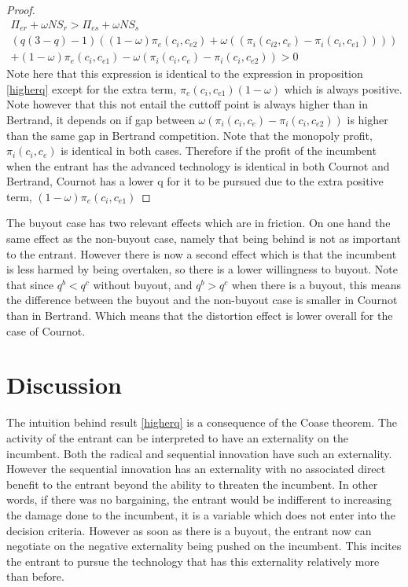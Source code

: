 \documentclass[12pt]{report}
\numberwithin{equation}{section}
\begin{document}
\begin{proof}
\begin{align*}
\Pi_{er} + \omega NS_{r}
> \Pi_{es} + \omega NS_{s} \\
(q  (3-q)-1)((1-\omega)\pi_{e}(c_i,c_{e2})+\omega((\pi_{i}(c_{i2},c_{e})-\pi_{i}(c_i,c_{e1})))) \\
+(1-\omega)\pi_{e}(c_i,c_{e1})
-\omega(\pi_{i}(c_i,c_{e}) 
-\pi_{i}(c_{i},c_{e2}))>0
\end{align*} 
Note here that this expression is identical to the expression in proposition \ref{higherq} except for the extra term, $\pi_{e}(c_i,c_{e1})(1-\omega)$ which is always positive. Note however that this not entail the cuttoff point is always higher than in Bertrand, it depends on if gap between $\omega(\pi_{i}(c_i,c_{e}) 
-\pi_{i}(c_{i},c_{e2}))$ is higher than the same gap in Bertrand competition. Note that the monopoly profit,$\pi_{i}(c_i,c_{e})$ is identical in both cases. Therefore if the profit of the incumbent when the entrant has the advanced technology is identical in both Cournot and Bertrand, Cournot has a lower q for it to be pursued due to the extra positive term, $(1-\omega) \pi_e(c_i,c_{e1})$ 
\end{proof}

The buyout case has two relevant effects which are in friction. On one hand the same effect as the non-buyout case, namely that being behind is not as important to the entrant. However there is now a second effect which is that the incumbent is less harmed by being overtaken, so there is a lower willingness to buyout. Note that since $q^b<q^c$ without buyout, and $q^b>q^c$ when there is a buyout, this means the difference between the buyout and the non-buyout case is smaller in Cournot than in Bertrand. Which means that the distortion effect is lower overall for the case of Cournot. 

\section{Discussion}\label{discussion}

The intuition behind result \ref{higherq} is a consequence of the Coase theorem. The activity of the entrant can be interpreted to have an externality on the incumbent. Both the radical and sequential innovation have such an externality. However the sequential innovation has an externality with no associated direct benefit to the entrant beyond the ability to threaten the incumbent. In other words, if there was no bargaining, the entrant would be indifferent to increasing the damage done to the incumbent, it is a variable which does not enter into the decision criteria. However as soon as there is a buyout, the entrant now can negotiate on the negative externality being pushed on the incumbent. This incites the entrant to pursue the technology that has this externality relatively more than before. 
\end{document}

